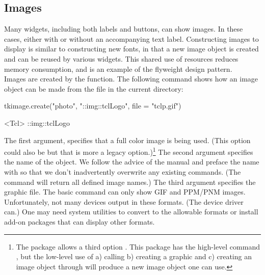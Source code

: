 \subsection{Images}
\label{sec:tcltk:overview:images}


Many  widgets, including both labels and buttons, can show
images. In these cases, either with or without an accompanying text
label. Constructing images to display is similar to constructing new
fonts, in that a new image object is created and can be reused by
various widgets. This shared use of resources reduces memory
consumption, and is an example of the flyweight design pattern.
\\

Images are created by the  function.
The following command shows how an image object can be made from the
file  in the current directory:

\begin{Schunk}
\begin{Sinput}
 tkimage.create("photo", "::img::tclLogo", file = "tclp.gif")
\end{Sinput}
\begin{Soutput}
<Tcl> ::img::tclLogo 
\end{Soutput}
\end{Schunk}


The first argument,  specifies that a full color image is
being used. (This option could also be  but that is more
a legacy option.)\footnote{The  package allows a third
  option . This package has the high-level command
  , but the low-level use of a) calling
   b) creating a graphic and c) creating an image
  object through  will
  produce a new image object one can use.} The second argument
specifies the name of the object. We follow the advice of the \TK\/
manual and preface the name with  so that we don't
inadvertently overwrite any existing \TCL\/ commands. (The command
 will return all defined image names.) The
third argument  specifies the graphic
file. The basic \TK\/  command can only show GIF and
PPM/PNM images. Unfortunately, not many \R\/ devices output in these
formats. (The  device driver can.) One may need system
utilities to convert to the allowable formats or install add-on \TCL\/
packages that can display other formats.~

